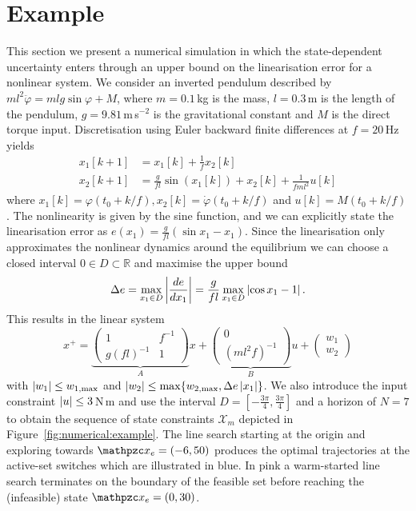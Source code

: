 \section{Example}\label{sec:example}
This section we present a numerical simulation in which the state-dependent uncertainty enters through an upper bound on the linearisation
error for a nonlinear system. We consider an inverted pendulum described by $ml^2\ddot\varphi = mlg\sin\varphi+M$, where
$m=0.1$\,kg is the mass, $l=0.3$\,m is the length of the pendulum, $g=9.81$\,m\,s$\mbox{}^{-2}$ is the gravitational
constant and $M$ is the direct torque input. Discretisation using Euler backward finite differences 
at $f = 20$\,Hz yields
\begin{equation}
  \begin{split}
    x_1[k+1] &= x_1[k] + \frac{1}{f} x_2[k]\\
    x_2[k+1] &= \frac{g}{fl} \sin(x_1[k]) + x_2[k] + \frac{1}{fml^2}u[k]
  \end{split}
\end{equation}
where $x_1[k] = \varphi(t_0+k/f),x_2[k] = \dot\varphi(t_0+k/f)$ and $u[k] = M(t_0+k/f)$.
The nonlinearity is given by the sine function, and we can explicitly state the 
linearisation error as $e(x_1)=\frac{g}{fl}(\sin x_1 - x_1)$. Since the linearisation
only approximates the nonlinear dynamics around the equilibrium we can choose a closed interval 
$0\in D\subset\mathbb R$ and maximise the upper bound 
\begin{equation}
  \Delta e = \max_{x_1\in D}\left|\frac{de}{dx_1}\right| = \frac{g}{fl}\max_{x_1\in D}\left|\cos x_1-1\right|.
\end{equation}
This results in the linear system
\begin{equation}
  x^+ = \underbrace{\left(\begin{array}{cc}
  1 & f^{-1}\\ g(fl)^{-1} & 1
  \end{array}\right)}_A x + \underbrace{\left(\begin{array}{c} 0 \\(ml^2f)^{-1} \end{array}\right)}_B u
  +\left(\begin{array}{c}w_1\\ w_2\end{array}\right)
\end{equation}
with $\left|w_1\right|\leq w_{1,\max}$ and $\left|w_2\right|\leq\max\{w_{2,\max},\Delta e \left|x_1\right|\}$.
We also introduce the input constraint $\left|u\right|\leq3$\,N\,m and use the interval $D = [-\frac{3\pi}{4},
\frac{3\pi}{4}]$ and a horizon of $N=7$ to obtain the sequence of state constraints $\mathcal X_m$
depicted in Figure~\ref{fig:numerical:example}. The line search starting at the origin and
exploring towards $\mathpzc x_e=(-6,50)$ produces the optimal trajectories at the active-set switches
which are illustrated in blue. In pink a warm-started line search terminates on the boundary of the
feasible set before reaching the (infeasible) state $\mathpzc x_e=(0,30)$.